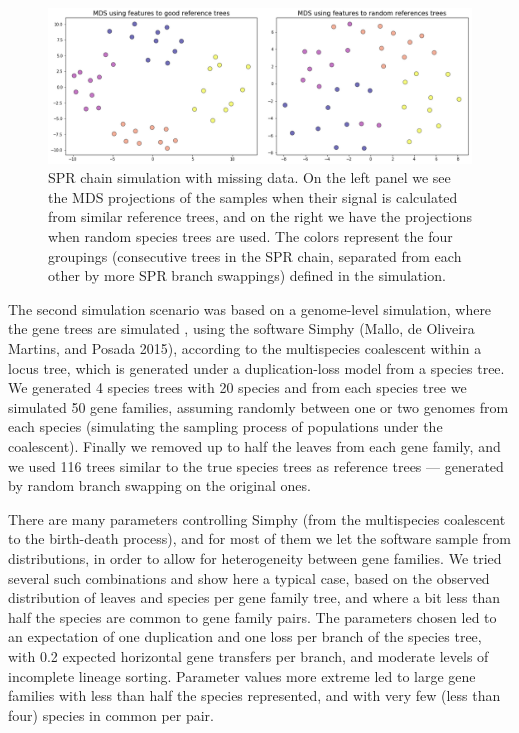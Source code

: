 \begin{figure}[!htbp]
\begin{minipage}{7in}\centering\includegraphics[width = 6.5in]{figure002.png}\end{minipage}
\caption{\label{figure002}
 SPR chain simulation with missing data. On the left panel we see the MDS projections of the samples when their signal
 is calculated from similar reference trees, and on the right we have the projections when random species trees are
 used. The colors represent the four groupings (consecutive trees in the SPR chain, separated from each other by more
 SPR branch swappings) defined in the simulation. 
}\end{figure}


The second simulation scenario was based on a genome-level simulation, where the gene trees are simulated , using the
software Simphy (Mallo, de Oliveira Martins, and Posada 2015), according to the multispecies coalescent within a locus
tree, which is generated under a duplication-loss model from a species tree. We generated 4 species trees with 20
species and from each species tree we simulated 50 gene families, assuming randomly between one or two genomes from each
species (simulating the sampling process of populations under the coalescent). Finally we removed up to half the leaves
from each gene family, and we used 116 trees similar to the true species trees as reference trees --- generated by random
branch swapping on the original ones.

There are many parameters controlling Simphy (from the multispecies coalescent to the birth-death process), and for most
of them we let the software sample from distributions, in order to allow for heterogeneity between gene families. We
tried several such combinations and show here a typical case, based on the observed distribution of leaves and species
per gene family tree, and where a bit less than half the species are common to gene family pairs. The parameters chosen
led to an expectation of one duplication and one loss per branch of the species tree, with 0.2 expected horizontal gene
transfers per branch, and moderate levels of incomplete lineage sorting. Parameter values more extreme led to large gene
families with less than half the species represented, and with very few (less than four) species in common per pair.

